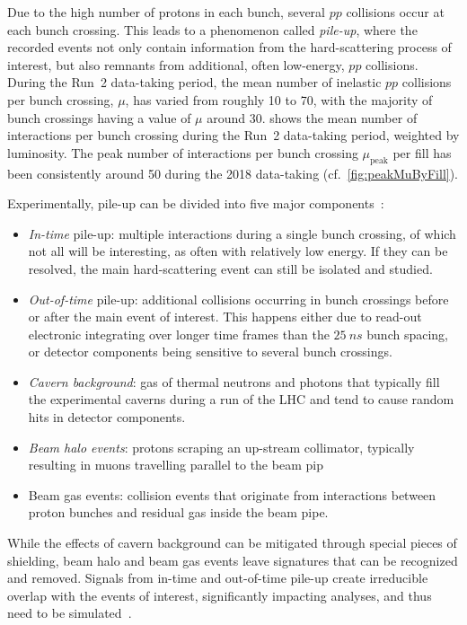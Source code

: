 Due to the high number of protons in each bunch, several $pp$ collisions occur at each bunch crossing. This leads to a phenomenon called \textit{pile-up}, where the recorded events not only contain information from the hard-scattering process of interest, but also remnants from additional, often low-energy, $pp$ collisions. During the Run~2 data-taking period, the mean number of inelastic $pp$ collisions per bunch crossing, $\mu$, has varied from roughly 10 to 70, with the majority of bunch crossings having a value of $\mu$ around 30.  shows the mean number of interactions per bunch crossing during the Run~2 data-taking period, weighted by luminosity. The peak number of interactions per bunch crossing $\mu_\mathrm{peak}$ per fill has been consistently around 50 during the 2018 data-taking (cf.~\cref{fig:peakMuByFill}).

Experimentally, pile-up can be divided into five major components~\cite{Marshall:2014mza}:
\begin{itemize}
	\item \textit{In-time} pile-up: multiple interactions during a single bunch crossing, of which not all will be interesting, as often with relatively low energy. If they can be resolved, the main hard-scattering event can still be isolated and studied.
	\item \textit{Out-of-time} pile-up: additional collisions occurring in bunch crossings before or after the main event of interest. This happens either due to read-out electronic integrating over longer time frames than the $\SI{25}{ns}$ bunch spacing, or detector components being sensitive to several bunch crossings.
	\item \textit{Cavern background}: gas of thermal neutrons and photons that typically fill the experimental caverns during a run of the LHC and tend to cause random hits in detector components.
	\item \textit{Beam halo events}: protons scraping an up-stream collimator, typically resulting in muons travelling parallel to the beam pip
	\item Beam gas events: collision events that originate from interactions between proton bunches and residual gas inside the beam pipe.
\end{itemize}
While the effects of cavern background can be mitigated through special pieces of shielding, beam halo and beam gas events leave signatures that can be recognized and removed. Signals from in-time and out-of-time pile-up create irreducible overlap with the events of interest, significantly impacting analyses, and thus need to be simulated~\cite{Marshall:2014mza}.

